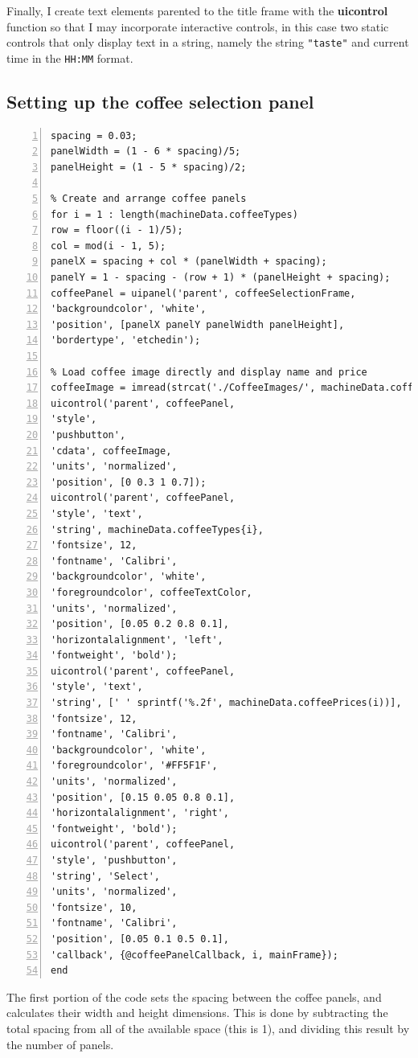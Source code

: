 \documentclass[a4paper, 11pt]{article}
\begin{document}
\vspace{5mm}
\noindent Finally, I create text elements parented to the title frame with the \textbf{uicontrol} function so that I may incorporate interactive controls, in this case two static controls that only display text in a string, namely the string \texttt{"taste"} and current time in the \texttt{HH:MM} format.

\subsection{Setting up the coffee selection panel}
\begin{lstlisting}[style=Matlab-editor, numbers = left, frame = single]
% Spacing and panel dimensions for coffee panels
spacing = 0.03;
panelWidth = (1 - 6 * spacing)/5;
panelHeight = (1 - 5 * spacing)/2;

% Create and arrange coffee panels
for i = 1 : length(machineData.coffeeTypes)
row = floor((i - 1)/5);
col = mod(i - 1, 5);
panelX = spacing + col * (panelWidth + spacing);
panelY = 1 - spacing - (row + 1) * (panelHeight + spacing);
coffeePanel = uipanel('parent', coffeeSelectionFrame, 
'backgroundcolor', 'white', 
'position', [panelX panelY panelWidth panelHeight], 
'bordertype', 'etchedin');

% Load coffee image directly and display name and price
coffeeImage = imread(strcat('./CoffeeImages/', machineData.coffeeTypes{i}, '.png'));
uicontrol('parent', coffeePanel, 
'style', 
'pushbutton', 
'cdata', coffeeImage, 
'units', 'normalized', 
'position', [0 0.3 1 0.7]);
uicontrol('parent', coffeePanel, 
'style', 'text', 
'string', machineData.coffeeTypes{i}, 
'fontsize', 12, 
'fontname', 'Calibri', 
'backgroundcolor', 'white', 
'foregroundcolor', coffeeTextColor, 
'units', 'normalized', 
'position', [0.05 0.2 0.8 0.1], 
'horizontalalignment', 'left', 
'fontweight', 'bold');
uicontrol('parent', coffeePanel, 
'style', 'text', 
'string', [' ' sprintf('%.2f', machineData.coffeePrices(i))], 
'fontsize', 12, 
'fontname', 'Calibri', 
'backgroundcolor', 'white', 
'foregroundcolor', '#FF5F1F', 
'units', 'normalized', 
'position', [0.15 0.05 0.8 0.1], 
'horizontalalignment', 'right', 
'fontweight', 'bold');
uicontrol('parent', coffeePanel, 
'style', 'pushbutton', 
'string', 'Select', 
'units', 'normalized', 
'fontsize', 10, 
'fontname', 'Calibri', 
'position', [0.05 0.1 0.5 0.1], 
'callback', {@coffeePanelCallback, i, mainFrame});
end
\end{lstlisting}
\vspace{5mm}
\noindent The first portion of the code sets the spacing between the coffee panels, and calculates their width and height dimensions. This is done by subtracting the total spacing from all of the available space (this is 1), and dividing this result by the number of panels.
\vspace{5mm}
\end{document}
